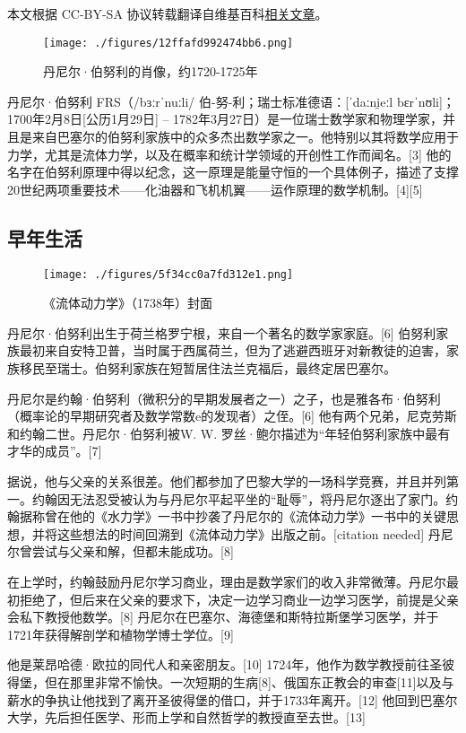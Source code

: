 
本文根据 CC-BY-SA 协议转载翻译自维基百科\href{https://en.wikipedia.org/wiki/Michael_Faraday}{相关文章}。

\begin{figure}[ht]
\centering
\texttt{[image: ./figures/12ffafd992474bb6.png]}
\caption{丹尼尔·伯努利的肖像，约1720-1725年} \label{fig_BNL_1}
\end{figure}
丹尼尔·伯努利 FRS（/bɜːrˈnuːli/ 伯-努-利；瑞士标准德语：[ˈdaːni̯eːl bɛrˈnʊli]；1700年2月8日[公历1月29日] – 1782年3月27日）是一位瑞士数学家和物理学家，并且是来自巴塞尔的伯努利家族中的众多杰出数学家之一。他特别以其将数学应用于力学，尤其是流体力学，以及在概率和统计学领域的开创性工作而闻名。[3] 他的名字在伯努利原理中得以纪念，这一原理是能量守恒的一个具体例子，描述了支撑20世纪两项重要技术——化油器和飞机机翼——运作原理的数学机制。[4][5]
\subsection{早年生活}
\begin{figure}[ht]
\centering
\texttt{[image: ./figures/5f34cc0a7fd312e1.png]}
\caption{《流体动力学》（1738年）封面} \label{fig_BNL_2}
\end{figure}
丹尼尔·伯努利出生于荷兰格罗宁根，来自一个著名的数学家家庭。[6] 伯努利家族最初来自安特卫普，当时属于西属荷兰，但为了逃避西班牙对新教徒的迫害，家族移民至瑞士。伯努利家族在短暂居住法兰克福后，最终定居巴塞尔。

丹尼尔是约翰·伯努利（微积分的早期发展者之一）之子，也是雅各布·伯努利（概率论的早期研究者及数学常数e的发现者）之侄。[6] 他有两个兄弟，尼克劳斯和约翰二世。丹尼尔·伯努利被W. W. 罗丝·鲍尔描述为“年轻伯努利家族中最有才华的成员”。[7]

据说，他与父亲的关系很差。他们都参加了巴黎大学的一场科学竞赛，并且并列第一。约翰因无法忍受被认为与丹尼尔平起平坐的“耻辱”，将丹尼尔逐出了家门。约翰据称曾在他的《水力学》一书中抄袭了丹尼尔的《流体动力学》一书中的关键思想，并将这些想法的时间回溯到《流体动力学》出版之前。[citation needed] 丹尼尔曾尝试与父亲和解，但都未能成功。[8]

在上学时，约翰鼓励丹尼尔学习商业，理由是数学家们的收入非常微薄。丹尼尔最初拒绝了，但后来在父亲的要求下，决定一边学习商业一边学习医学，前提是父亲会私下教授他数学。[8] 丹尼尔在巴塞尔、海德堡和斯特拉斯堡学习医学，并于1721年获得解剖学和植物学博士学位。[9]

他是莱昂哈德·欧拉的同代人和亲密朋友。[10] 1724年，他作为数学教授前往圣彼得堡，但在那里非常不愉快。一次短期的生病[8]、俄国东正教会的审查[11]以及与薪水的争执让他找到了离开圣彼得堡的借口，并于1733年离开。[12] 他回到巴塞尔大学，先后担任医学、形而上学和自然哲学的教授直至去世。[13]

